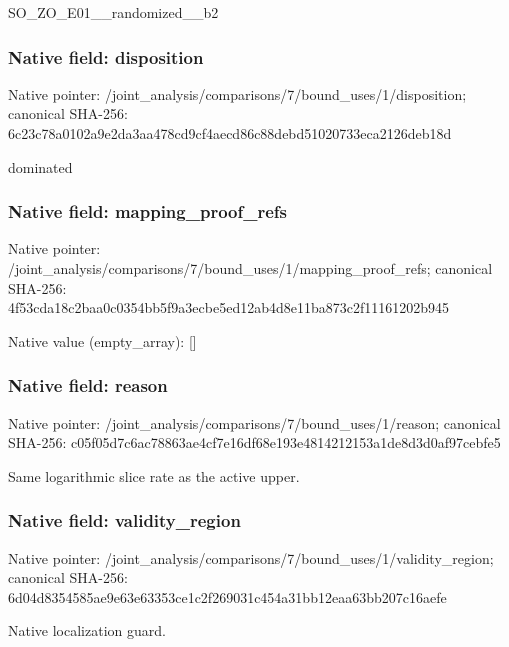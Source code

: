 \documentclass[10pt,a4paper]{article}
\begin{document}
\begingroup\raggedright\sloppy SO\_\allowbreak{}ZO\_\allowbreak{}E01\_\allowbreak{}\_\allowbreak{}randomized\_\allowbreak{}\_\allowbreak{}b2\par\endgroup

\subsubsection{Native field: disposition}
Native pointer: /joint\_\allowbreak{}analysis/comparisons/7/bound\_\allowbreak{}uses/1/disposition; canonical SHA-256: 6c23c78a0102a9e2da3aa478cd9cf4aecd86c88debd51020733eca2126deb18d

\begingroup\raggedright\sloppy dominated\par\endgroup

\subsubsection{Native field: mapping\_\allowbreak{}proof\_\allowbreak{}refs}
Native pointer: /joint\_\allowbreak{}analysis/comparisons/7/bound\_\allowbreak{}uses/1/mapping\_\allowbreak{}proof\_\allowbreak{}refs; canonical SHA-256: 4f53cda18c2baa0c0354bb5f9a3ecbe5ed12ab4d8e11ba873c2f11161202b945

Native value (empty\_\allowbreak{}array): []

\subsubsection{Native field: reason}
Native pointer: /joint\_\allowbreak{}analysis/comparisons/7/bound\_\allowbreak{}uses/1/reason; canonical SHA-256: c05f05d7c6ac78863ae4cf7e16df68e193e4814212153a1de8d3d0af97cebfe5

\begingroup\raggedright\sloppy Same logarithmic slice rate as the active upper.\par\endgroup

\subsubsection{Native field: validity\_\allowbreak{}region}
Native pointer: /joint\_\allowbreak{}analysis/comparisons/7/bound\_\allowbreak{}uses/1/validity\_\allowbreak{}region; canonical SHA-256: 6d04d8354585ae9e63e63353ce1c2f269031c454a31bb12eaa63bb207c16aefe

\begingroup\raggedright\sloppy Native localization guard.\par\endgroup
\end{document}
